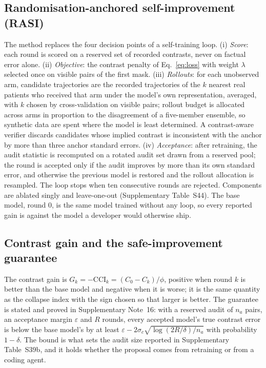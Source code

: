 \documentclass[11pt,a4paper]{article}
\newcommand{\CCI}{\mathrm{CCI}}
\begin{document}
\subsection{Randomisation-anchored self-improvement (RASI)}
The method replaces the four decision points of a self-training loop. (i) \emph{Score}: each round is scored on a reserved set of recorded contrasts, never on factual error alone. (ii) \emph{Objective}: the contrast penalty of Eq.~\ref{eq:loss} with weight $\lambda$ selected once on visible pairs of the first mask. (iii) \emph{Rollouts}: for each unobserved arm, candidate trajectories are the recorded trajectories of the $k$ nearest real patients who received that arm under the model's own representation, averaged, with $k$ chosen by cross-validation on visible pairs; rollout budget is allocated across arms in proportion to the disagreement of a five-member ensemble, so synthetic data are spent where the model is least determined. A contrast-aware verifier discards candidates whose implied contrast is inconsistent with the anchor by more than three anchor standard errors. (iv) \emph{Acceptance}: after retraining, the audit statistic is recomputed on a rotated audit set drawn from a reserved pool; the round is accepted only if the audit improves by more than its own standard error, and otherwise the previous model is restored and the rollout allocation is resampled. The loop stops when ten consecutive rounds are rejected. Components are ablated singly and leave-one-out (Supplementary Table~S44). The base model, round 0, is the same model trained without any loop, so every reported gain is against the model a developer would otherwise ship.

\subsection{Contrast gain and the safe-improvement guarantee}
The contrast gain is $G_k=-\CCI_k=(C_0-C_k)/\phi$, positive when round $k$ is better than the base model and negative when it is worse; it is the same quantity as the collapse index with the sign chosen so that larger is better. The guarantee is stated and proved in Supplementary Note~16: with a reserved audit of $n_a$ pairs, an acceptance margin $\varepsilon$ and $R$ rounds, every accepted model's true contrast error is below the base model's by at least $\varepsilon-2\sigma_c\sqrt{\log(2R/\delta)/n_a}$ with probability $1-\delta$. The bound is what sets the audit size reported in Supplementary Table~S39b, and it holds whether the proposal comes from retraining or from a coding agent.
\end{document}

